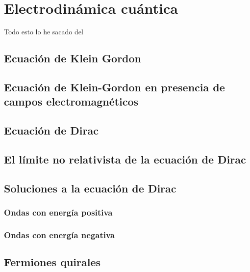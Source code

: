 \setchapterpreamble[u]{\margintoc}
\chapter{Electrodinámica cuántica}

\begin{center}
  \large Todo esto lo he sacado del \cite{Dobdado}
\end{center}
\section{Ecuación de Klein Gordon}
\section{Ecuación de Klein-Gordon en presencia de campos electromagnéticos}
\section{Ecuación de Dirac}
\section{El límite no relativista de la ecuación de Dirac}
\section{Soluciones a la ecuación de Dirac}
\subsection{Ondas con energía positiva}
\subsection{Ondas con energía negativa}
\section{Fermiones quirales}